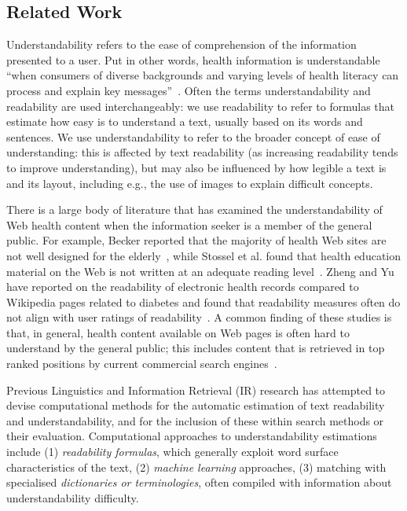 \subsection{Related Work}

\label{sec:related}
Understandability refers to the ease of comprehension of the information presented to a user. Put in other words, health information is understandable ``when consumers of diverse backgrounds and varying levels of health literacy can process and explain key messages''~\cite{shoemaker2014development}. Often the terms understandability and readability are used interchangeably: we use readability to refer to formulas that estimate how easy is to understand a text, usually based on its words and sentences. We use understandability to refer to the broader concept of ease of understanding: this is affected by text readability (as increasing readability tends to improve understanding), but may also be influenced by how legible a text is and its layout, including e.g., the use of images to explain difficult concepts.

There is a large body of literature that has examined the understandability of Web health content when the information seeker is a member of the general public. For example, Becker reported that the majority of health Web sites are not well designed for the elderly~\cite{becker04}, while Stossel et al. found that  health education material on the Web is not written at an adequate reading level~\cite{stossel12}. Zheng and Yu have reported on the readability of electronic health records compared to Wikipedia pages related to diabetes and found that readability measures often do not align with user ratings of readability~\cite{zheng2017readability}. 
A common finding of these studies is that, in general, health content available on Web pages is often hard to understand by the general public; this includes content that is retrieved in top ranked positions by current commercial search engines~\cite{graber99,fitzsimmons10,wiener13,patel13,meillier17}.

Previous Linguistics and Information Retrieval (IR) research has attempted to devise computational methods for the automatic estimation of text readability and understandability, and for the inclusion of these within search methods or their evaluation. Computational approaches to understandability estimations include (1) \textit{readability formulas}, which generally exploit word surface characteristics of the text, (2) \textit{machine learning} approaches, (3) matching with specialised \textit{dictionaries or terminologies}, often compiled with information about understandability difficulty.

